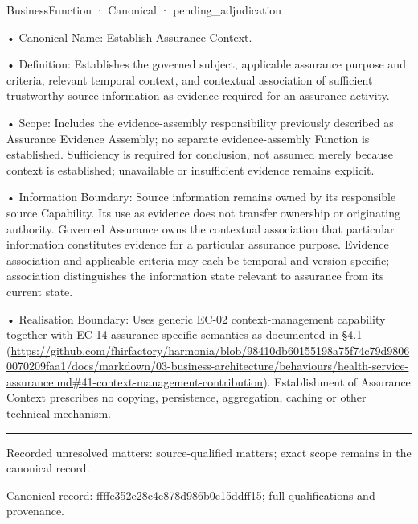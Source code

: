 \label{element:ffffe352e28c4e878d986b0e15ddff15}
{\small BusinessFunction · Canonical · pending\_adjudication}\par

•
Canonical Name: Establish Assurance Context.



•
Definition: Establishes the governed subject, applicable assurance purpose and criteria, relevant temporal context, and contextual association of sufficient trustworthy source information as evidence required for an assurance activity.



•
Scope: Includes the evidence-assembly responsibility previously described as Assurance Evidence Assembly; no separate evidence-assembly Function is established. Sufficiency is required for conclusion, not assumed merely because context is established; unavailable or insufficient evidence remains explicit.



•
Information Boundary: Source information remains owned by its responsible source Capability. Its use as evidence does not transfer ownership or originating authority. Governed Assurance owns the contextual association that particular information constitutes evidence for a particular assurance purpose. Evidence association and applicable criteria may each be temporal and version-specific; association distinguishes the information state relevant to assurance from its current state.



•
Realisation Boundary: Uses generic EC-02 context-management capability together with EC-14 assurance-specific semantics as documented in §4.1 (\url{https://github.com/fhirfactory/harmonia/blob/98410db60155198a75f74c79d98060070209faa1/docs/markdown/03-business-architecture/behaviours/health-service-assurance.md#41-context-management-contribution}). Establishment of Assurance Context prescribes no copying, persistence, aggregation, caching or other technical mechanism.



\medskip\hrule\medskip

{\small Recorded unresolved matters: source-qualified matters; exact scope remains in the canonical record.}\par
{\footnotesize \href{../../../../continuum/business/business-function/ffffe352e28c4e878d986b0e15ddff15.md}{Canonical record: ffffe352e28c4e878d986b0e15ddff15}; full qualifications and provenance.}\par
